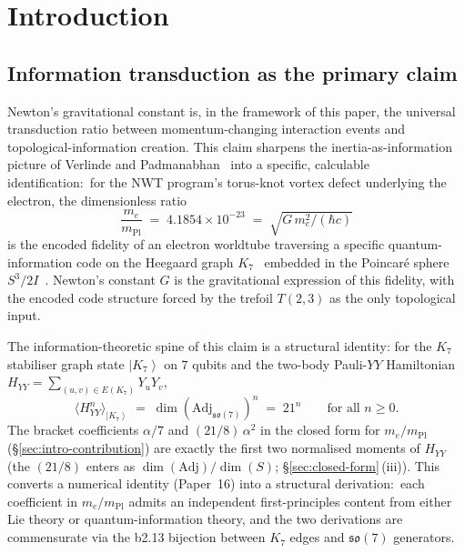 \documentclass[11pt]{article}
\newcommand{\so}{\mathfrak{so}}
\newcommand{\Adj}{\mathrm{Adj}}
\newcommand{\ket}[1]{\left|#1\right\rangle}
\newcommand{\mPl}{m_{\mathrm{Pl}}}
\begin{document}
\tableofcontents

\section{Introduction}
\label{sec:intro}

\subsection{Information transduction as the primary claim}
\label{sec:intro-headline}

Newton's gravitational constant is, in the framework of this paper,
the universal transduction ratio between momentum-changing
interaction events and topological-information creation.  This claim
sharpens the inertia-as-information picture of Verlinde and
Padmanabhan~\cite{verlinde2011,padmanabhan2010} into a specific,
calculable identification:\ for the
NWT program's torus-knot vortex defect underlying the electron,
the dimensionless ratio
\begin{equation}
  \frac{m_e}{\mPl} \;=\; 4.1854\times 10^{-23}
  \;=\; \sqrt{G\, m_e^2 / (\hbar c)}
\end{equation}
is the encoded fidelity of an electron worldtube traversing a
specific quantum-information code on the Heegaard graph
$K_7$~\cite{heawood1890,ringel-youngs} embedded in the Poincar\'e
sphere $S^3/2I$~\cite{brieskorn1966}.  Newton's constant
$G$ is the gravitational expression of this fidelity, with the
encoded code structure forced by the trefoil $T(2,3)$ as the only
topological input.

The information-theoretic spine of this claim is a structural
identity: for the $K_7$ stabiliser graph state $\ket{K_7}$ on $7$
qubits and the two-body Pauli-$YY$ Hamiltonian
$H_{YY} = \sum_{(u,v) \in E(K_7)} Y_u Y_v$,
\begin{equation}
  \langle H_{YY}^n \rangle_{\ket{K_7}}
  \;=\; \dim(\Adj_{\so(7)})^n
  \;=\; 21^n
  \qquad \text{for all } n \geq 0.
  \label{eq:intro-moment-identity}
\end{equation}
The bracket coefficients $\alpha/7$ and $(21/8)\,\alpha^2$ in the
closed form for $m_e/\mPl$ (\S\ref{sec:intro-contribution}) are
exactly the first two normalised moments of $H_{YY}$ (the
$(21/8)$ enters as $\dim(\Adj)/\dim(S)$;
\S\ref{sec:closed-form}\,(iii)).  This converts a numerical
identity (Paper~16) into a structural derivation:\ each coefficient
in $m_e/\mPl$ admits an independent first-principles content from
either Lie theory or quantum-information theory, and the two
derivations are commensurate via the b2.13 bijection between $K_7$
edges and $\so(7)$ generators.
\end{document}
